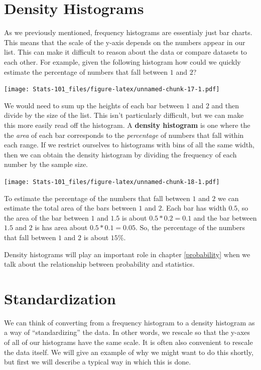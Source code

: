 \documentclass[]{book}
\begin{document}
\hypertarget{density-histograms}{%
\section{Density Histograms}\label{density-histograms}}

As we previously mentioned, frequency histograms are essentialy just bar charts. This means that the scale of the y-axis depends on the numbers appear in our list. This can make it difficult to reason about the data or compare datasets to each other. For example, given the following histogram how could we quickly estimate the percentage of numbers that fall between \(1\) and \(2\)?

\texttt{[image: Stats-101\_files/figure-latex/unnamed-chunk-17-1.pdf]}

We would need to sum up the heights of each bar between \(1\) and \(2\) and then divide by the size of the list. This isn't particularly difficult, but we can make this more easily read off the histogram. A \textbf{density histogram} is one where the the \emph{area} of each bar corresponds to the \emph{percentage} of numbers that fall within each range. If we restrict ourselves to histograms with bins of all the same width, then we can obtain the density histogram by dividing the frequency of each number by the sample size.

\texttt{[image: Stats-101\_files/figure-latex/unnamed-chunk-18-1.pdf]}

To estimate the percentage of the numbers that fall between \(1\) and \(2\) we can estimate the total area of the bars between \(1\) and \(2\). Each bar has width \(0.5\), so the area of the bar between \(1\) and \(1.5\) is about \(0.5 * 0.2 = 0.1\) and the bar between \(1.5\) and \(2\) is has area about \(0.5 * 0.1 = 0.05\). So, the percentage of the numbers that fall between \(1\) and \(2\) is about \(15\%\).

Density histograms will play an important role in chapter \ref{probability} when we talk about the relationship between probability and statistics.

\hypertarget{standardization}{%
\section{Standardization}\label{standardization}}

We can think of converting from a frequency histogram to a density histogram as a way of ``standardizing'' the data. In other words, we rescale so that the y-axes of all of our histograms have the same scale. It is often also convenient to rescale the data itself. We will give an example of why we might want to do this shortly, but first we will describe a typical way in which this is done.
\end{document}
